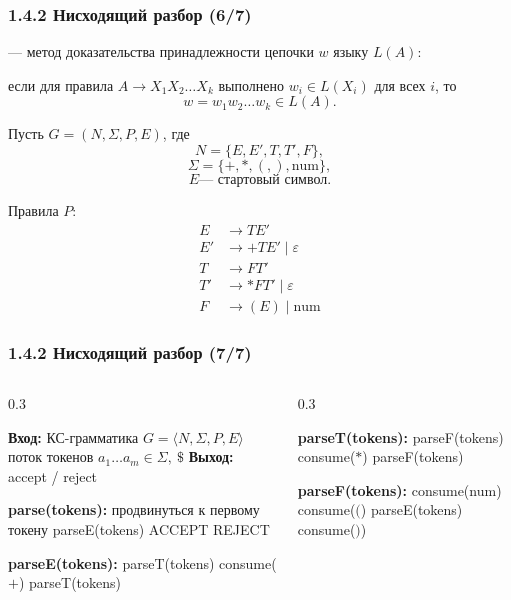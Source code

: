 \begin{frame}
\frametitle{1.4.2 Нисходящий разбор (6/7)}
 --- метод доказательства принадлежности цепочки $w$ языку $L(A)$:

если для правила $A \to X_1 X_2 \dots X_k$ выполнено $w_i \in L(X_i)$ для всех $i$, то
\[
w = w_1 w_2 \dots w_k \in L(A).
\]

Пусть $G = (N, \Sigma, P, E)$, где
\[
N = \{E, E', T, T', F\}, 
\]
\[
\Sigma = \{+, *, (, ), \text{num}\},
\]
\[E \text{--- стартовый символ.}
\]

Правила $P$:
\begin{align*}
    E  &\to T E' \\
    E' &\to + T E' \mid \varepsilon \\
    T  &\to F T' \\
    T' &\to * F T' \mid \varepsilon \\
    F  &\to (E) \mid \text{num}
\end{align*}
\end{frame}

\begin{frame}
\frametitle{1.4.2 Нисходящий разбор (7/7)}


\begin{columns}[t]
\begin{column}{0.3\textwidth}
\scriptsize
\begin{algorithmic}
\STATE \textbf{Вход:}
\STATE КС-грамматика $G=\langle N,\Sigma,P,E\rangle$
\STATE поток токенов $a_1\dots a_m \in \Sigma,\ \$$
\STATE \textbf{Выход:} accept / reject

\STATE
\STATE \textbf{parse(tokens):}
\STATE продвинуться к первому токену
\STATE parseE(tokens)
    \STATE ACCEPT
\ELSE
    \STATE REJECT
\ENDIF

\STATE
\STATE \textbf{parseE(tokens):} 
    \STATE parseT(tokens)
        \STATE consume($+$)
        \STATE parseT(tokens)
    \ENDWHILE
\end{algorithmic}
\end{column}

\begin{column}{0.3\textwidth}
\scriptsize
\begin{algorithmic}
\STATE \textbf{parseT(tokens):} 
    \STATE parseF(tokens)
        \STATE consume($*$)
        \STATE parseF(tokens)
    \ENDWHILE

\STATE
\STATE \textbf{parseF(tokens):} 
        \STATE consume(num)
        \STATE consume($($)
        \STATE parseE(tokens)
        \STATE consume($)$)
    \ENDIF
\end{algorithmic}
\end{column}
\end{columns}

\end{frame}

